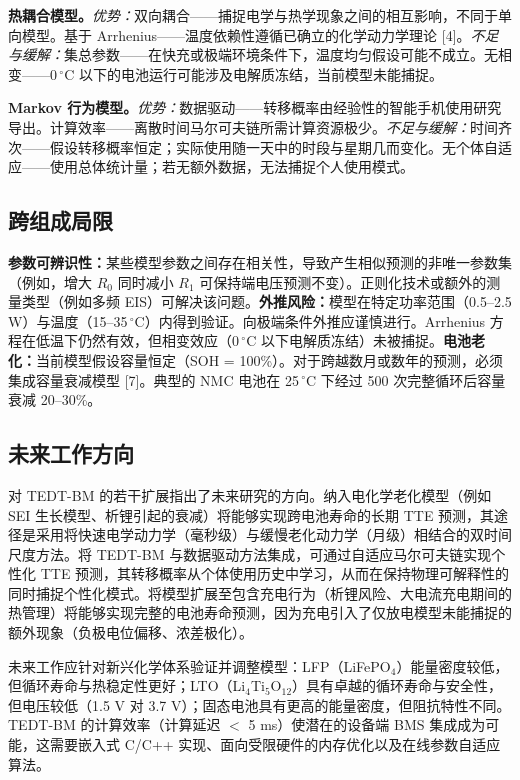 \documentclass[11pt,a4paper]{ctexart}
\begin{document}
\textbf{热耦合模型。}\emph{优势：}双向耦合——捕捉电学与热学现象之间的相互影响，不同于单向模型。基于 Arrhenius——温度依赖性遵循已确立的化学动力学理论 [4]。\emph{不足与缓解：}集总参数——在快充或极端环境条件下，温度均匀假设可能不成立。无相变——0\,$^{\circ}$C 以下的电池运行可能涉及电解质冻结，当前模型未能捕捉。

\textbf{Markov 行为模型。}\emph{优势：}数据驱动——转移概率由经验性的智能手机使用研究导出。计算效率——离散时间马尔可夫链所需计算资源极少。\emph{不足与缓解：}时间齐次——假设转移概率恒定；实际使用随一天中的时段与星期几而变化。无个体自适应——使用总体统计量；若无额外数据，无法捕捉个人使用模式。

\subsection{跨组成局限}

\textbf{参数可辨识性：}某些模型参数之间存在相关性，导致产生相似预测的非唯一参数集（例如，增大 $R_0$ 同时减小 $R_1$ 可保持端电压预测不变）。正则化技术或额外的测量类型（例如多频 EIS）可解决该问题。\textbf{外推风险：}模型在特定功率范围（0.5--2.5 W）与温度（15--35\,$^{\circ}$C）内得到验证。向极端条件外推应谨慎进行。Arrhenius 方程在低温下仍然有效，但相变效应（0\,$^{\circ}$C 以下电解质冻结）未被捕捉。\textbf{电池老化：}当前模型假设容量恒定（SOH = 100\%）。对于跨越数月或数年的预测，必须集成容量衰减模型 [7]。典型的 NMC 电池在 25\,$^{\circ}$C 下经过 500 次完整循环后容量衰减 20--30\%。

\subsection{未来工作方向}

对 TEDT-BM 的若干扩展指出了未来研究的方向。纳入电化学老化模型（例如 SEI 生长模型、析锂引起的衰减）将能够实现跨电池寿命的长期 TTE 预测，其途径是采用将快速电学动力学（毫秒级）与缓慢老化动力学（月级）相结合的双时间尺度方法。将 TEDT-BM 与数据驱动方法集成，可通过自适应马尔可夫链实现个性化 TTE 预测，其转移概率从个体使用历史中学习，从而在保持物理可解释性的同时捕捉个性化模式。将模型扩展至包含充电行为（析锂风险、大电流充电期间的热管理）将能够实现完整的电池寿命预测，因为充电引入了仅放电模型未能捕捉的额外现象（负极电位偏移、浓差极化）。

未来工作应针对新兴化学体系验证并调整模型：LFP（LiFePO$_4$）能量密度较低，但循环寿命与热稳定性更好；LTO（Li$_4$Ti$_5$O$_{12}$）具有卓越的循环寿命与安全性，但电压较低（1.5 V 对 3.7 V）；固态电池具有更高的能量密度，但阻抗特性不同。TEDT-BM 的计算效率（计算延迟 $<$ 5 ms）使潜在的设备端 BMS 集成成为可能，这需要嵌入式 C/C++ 实现、面向受限硬件的内存优化以及在线参数自适应算法。
\end{document}
